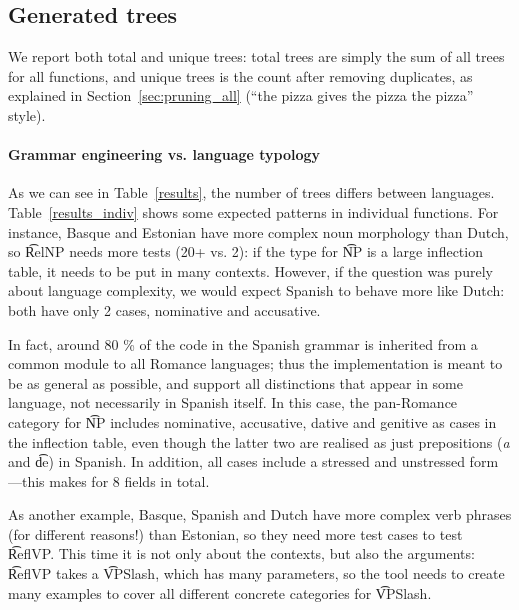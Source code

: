 \subsection{Generated trees}

We report both total and unique trees: total trees are simply the sum
of all trees for all functions, and unique trees is the count after
removing duplicates, as explained in Section~\ref{sec:pruning_all}
(``the pizza gives the pizza the pizza'' style).

\paragraph{Grammar engineering vs. language typology}
As we can see in Table~\ref{results}, the number of trees differs between
languages. Table~\ref{results_indiv} shows some expected patterns in
individual functions. For instance, Basque and Estonian have more
complex noun morphology than Dutch, so \t{RelNP} needs more tests (20+
vs. 2): if the type for \t{NP} is a large inflection table, it needs
to be put in many contexts. However, if the question was purely about
language complexity, we would expect Spanish to behave more like
Dutch: both have only 2 cases, nominative and accusative. 

In fact, around 80 \% of the code in the Spanish grammar is inherited
from a common module to all Romance languages; thus the implementation
is meant to be as general as possible, and support all distinctions
that appear in some language, not necessarily in Spanish itself. In
this case, the pan-Romance category for \t{NP} includes nominative,
accusative, dative and genitive as cases in the inflection table, even
though the latter two are realised as just prepositions (\emph{a} and
\t{de}) in Spanish. In addition, all cases include a stressed and
unstressed form---this makes for 8 fields in total.


As another example, Basque, Spanish and Dutch have more complex verb
phrases (for different reasons!) than Estonian, so they need more test
cases to test \t{ReflVP}. This time it is not only about the contexts,
but also the arguments: \t{ReflVP} takes a \t{VPSlash}, which has many
parameters, so the tool needs to create many examples to cover all
different concrete categories for \t{VPSlash}.

